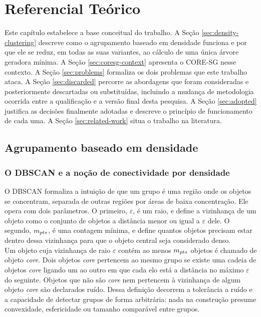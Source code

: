 
\chapter{Referencial Teórico\label{cha:theory-framework}}

Este capítulo estabelece a base conceitual do trabalho. A Seção \ref{sec:density-clustering} descreve como o agrupamento baseado em densidade funciona e por que ele se reduz, em todas as suas variantes, ao cálculo de uma única árvore geradora mínima. A Seção \ref{sec:coresg-context} apresenta o \ac{CORE-SG} nesse contexto. A Seção \ref{sec:problems} formaliza os dois problemas que este trabalho ataca. A Seção \ref{sec:discarded} percorre as abordagens que foram consideradas e posteriormente descartadas ou substituídas, incluindo a mudança de metodologia ocorrida entre a qualificação e a versão final desta pesquisa. A Seção \ref{sec:adopted} justifica as decisões finalmente adotadas e descreve o princípio de funcionamento de cada uma. A Seção \ref{sec:related-work} situa o trabalho na literatura.

\section{Agrupamento baseado em densidade\label{sec:density-clustering}}

\subsection{O DBSCAN e a noção de conectividade por densidade\label{sec:dbscan}}

O \ac{DBSCAN} \cite{dbscan} formaliza a intuição de que um grupo é uma região onde os objetos se concentram, separada de outras regiões por áreas de baixa concentração. Ele opera com dois parâmetros. O primeiro, $\varepsilon$, é um raio, e define a vizinhança de um objeto como o conjunto de objetos a distância menor ou igual a $\varepsilon$ dele. O segundo, $m_{pts}$, é uma contagem mínima, e define quantos objetos precisam estar dentro dessa vizinhança para que o objeto central seja considerado denso.\\

Um objeto cuja vizinhança de raio $\varepsilon$ contém ao menos $m_{pts}$ objetos é chamado de objeto \textit{core}. Dois objetos \textit{core} pertencem ao mesmo grupo se existe uma cadeia de objetos \textit{core} ligando um ao outro em que cada elo está a distância no máximo $\varepsilon$ do seguinte. Objetos que não são \textit{core} nem pertencem à vizinhança de algum objeto \textit{core} são declarados ruído. Dessa definição decorrem a tolerância a ruído e a capacidade de detectar grupos de forma arbitrária: nada na construção presume convexidade, esfericidade ou tamanho comparável entre grupos.\\

